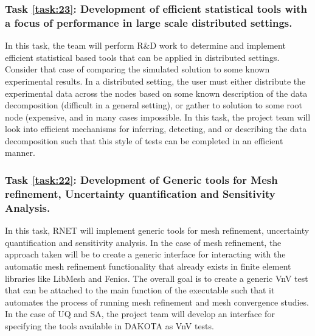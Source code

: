 
\label{task:23}
\subsubsection{Task \ref{task:23}: Development of efficient statistical \VV tools with a focus of performance in large scale distributed settings.}

In this task, the team will perform R\&D work to determine and implement efficient statistical based \VV tools that can be applied in distributed settings. Consider that case of comparing the simulated solution to some known experimental results. In a distributed setting, the user must either distribute the experimental data across the nodes based on some known description of the data decomposition (difficult in a general setting), or gather to solution to some root node (expensive, and in many cases impossible. In this task, the project team will look into efficient mechanisms for inferring, detecting, and or describing the data decomposition such that this style of tests can be completed in an efficient manner. 


\label{task:22}
\subsubsection{Task \ref{task:22}: Development of Generic tools for Mesh refinement, Uncertainty quantification and Sensitivity Analysis.}
In this task, RNET will implement generic \VV tools for mesh refinement, uncertainty quantification and sensitivity analysis. In the case of mesh refinement, the approach taken will be to create a generic interface for interacting with the automatic mesh refinement functionality that already exists in finite element libraries like LibMesh and Fenics. The overall goal is to create a generic VnV test that can be attached to the main function of the executable such that it automates the process of running mesh refinement and mesh convergence studies. In the case of UQ and SA, the project team will develop an interface for specifying the tools available in DAKOTA as VnV tests. 



